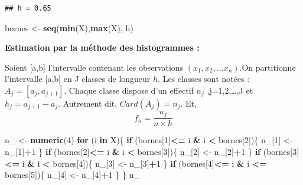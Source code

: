 \documentclass[
  12pt,
]{article}
\newenvironment{Shaded}{\begin{snugshade}}{\end{snugshade}}
\newcommand{\ControlFlowTok}[1]{\textcolor[rgb]{0.13,0.29,0.53}{\textbf{#1}}}
\newcommand{\DecValTok}[1]{\textcolor[rgb]{0.00,0.00,0.81}{#1}}
\newcommand{\FunctionTok}[1]{\textcolor[rgb]{0.13,0.29,0.53}{\textbf{#1}}}
\newcommand{\NormalTok}[1]{#1}
\newcommand{\OtherTok}[1]{\textcolor[rgb]{0.56,0.35,0.01}{#1}}
\newcommand{\SpecialCharTok}[1]{\textcolor[rgb]{0.81,0.36,0.00}{\textbf{#1}}}
\begin{document}
\begin{verbatim}
## h = 0.65
\end{verbatim}

\begin{Shaded}
\begin{Highlighting}[]
\NormalTok{bornes }\OtherTok{\textless{}{-}} \FunctionTok{seq}\NormalTok{(}\FunctionTok{min}\NormalTok{(X),}\FunctionTok{max}\NormalTok{(X), h)}
\end{Highlighting}
\end{Shaded}

\textbf{Estimation par la méthode des histogrammes : }

Soient {[}a,b{]} l'intervalle contenant les observations
\((x_1,x_2,...x_n)\).On partitionne l'intervalle {[}a,b{]} en J classes
de longueur \(h\). Les classes sont notées : \(A_j=[a_j,a_{j+1}]\).
Chaque classe dispose d'un effectif \(n_j\) ,j=1,2,\ldots,J et
\(h_j=a_{j+1}-a_j\). Autrement dit, \(Card(A_j )=n_j\). Et, \[
f_n=\frac{n_j}{n\times h}\]

\begin{Shaded}
\begin{Highlighting}[]
\NormalTok{n\_ }\OtherTok{\textless{}{-}} \FunctionTok{numeric}\NormalTok{(}\DecValTok{4}\NormalTok{)}
\ControlFlowTok{for}\NormalTok{ (i }\ControlFlowTok{in}\NormalTok{ X)\{}
  \ControlFlowTok{if}\NormalTok{ (bornes[}\DecValTok{1}\NormalTok{]}\SpecialCharTok{\textless{}=}\NormalTok{ i }\SpecialCharTok{\&}\NormalTok{ i }\SpecialCharTok{\textless{}}\NormalTok{ bornes[}\DecValTok{2}\NormalTok{])\{}
\NormalTok{    n\_[}\DecValTok{1}\NormalTok{] }\OtherTok{\textless{}{-}}\NormalTok{ n\_[}\DecValTok{1}\NormalTok{]}\SpecialCharTok{+}\DecValTok{1}
\NormalTok{  \}}
  \ControlFlowTok{if}\NormalTok{ (bornes[}\DecValTok{2}\NormalTok{]}\SpecialCharTok{\textless{}=}\NormalTok{ i }\SpecialCharTok{\&}\NormalTok{ i }\SpecialCharTok{\textless{}}\NormalTok{ bornes[}\DecValTok{3}\NormalTok{])\{}
\NormalTok{    n\_[}\DecValTok{2}\NormalTok{] }\OtherTok{\textless{}{-}}\NormalTok{ n\_[}\DecValTok{2}\NormalTok{]}\SpecialCharTok{+}\DecValTok{1}
\NormalTok{  \}}
  \ControlFlowTok{if}\NormalTok{ (bornes[}\DecValTok{3}\NormalTok{]}\SpecialCharTok{\textless{}=}\NormalTok{ i }\SpecialCharTok{\&}\NormalTok{ i }\SpecialCharTok{\textless{}}\NormalTok{ bornes[}\DecValTok{4}\NormalTok{])\{}
\NormalTok{    n\_[}\DecValTok{3}\NormalTok{] }\OtherTok{\textless{}{-}}\NormalTok{ n\_[}\DecValTok{3}\NormalTok{]}\SpecialCharTok{+}\DecValTok{1}
\NormalTok{  \}}
  \ControlFlowTok{if}\NormalTok{ (bornes[}\DecValTok{4}\NormalTok{]}\SpecialCharTok{\textless{}=}\NormalTok{ i }\SpecialCharTok{\&}\NormalTok{ i }\SpecialCharTok{\textless{}=}\NormalTok{ bornes[}\DecValTok{5}\NormalTok{])\{}
\NormalTok{    n\_[}\DecValTok{4}\NormalTok{] }\OtherTok{\textless{}{-}}\NormalTok{ n\_[}\DecValTok{4}\NormalTok{]}\SpecialCharTok{+}\DecValTok{1}
\NormalTok{  \}}
\NormalTok{\}}
\NormalTok{n\_ }
\end{Highlighting}
\end{Shaded}
\end{document}
